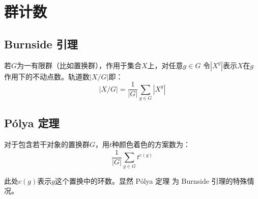 \section{群计数}
\subsection{Burnside 引理}
若$G$为一有限群（比如置换群），作用于集合$X$上，对任意$g\in G$
令$|X^g|$表示$X$在$g$作用下的不动点数。轨道数$|X/G|$即：
\[|X/G| = \frac{1}{|G|} \sum_{g\in G} |X^g|\]
\subsection{Pólya 定理}
对于包含若干对象的置换群$G$，用$t$种颜色着色的方案数为：
\[\frac{1}{|G|}\sum_{g\in G}t^{c(g)}\]\par
此处$c(g)$表示$g$这个置换中的环数。显然 Pólya 定理 为 Burnside
引理的特殊情况。